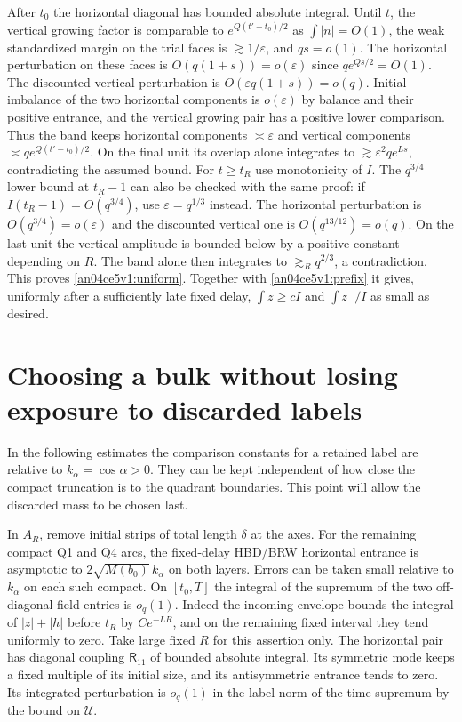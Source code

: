 \documentclass[11pt]{article}
\newcommand{\eps}{\varepsilon}
\begin{document}
After $t_0$ the horizontal diagonal has bounded absolute integral.
Until $t$, the vertical growing factor is comparable to $e^{Q(t'-t_0)/2}$
as $\int|n|=O(1)$, the weak standardized margin on the trial faces is
$\gtrsim1/\eps$, and $q s=o(1)$. The horizontal perturbation on these
faces is $O(q(1+s))=o(\eps)$ since $qe^{Qs/2}=O(1)$. The discounted
vertical perturbation is $O(\eps q(1+s))=o(q)$. Initial imbalance of
the two horizontal components is $o(\eps)$ by balance and their positive
entrance, and the vertical growing pair has a positive lower comparison.
Thus the band keeps horizontal components $\asymp\eps$ and vertical
components $\asymp q e^{Q(t'-t_0)/2}$. On the final unit its overlap alone
integrates to $\gtrsim \eps^2 q e^{Ls}$, contradicting the assumed bound.
For $t\ge t_R$ use monotonicity of $I$. The $q^{3/4}$ lower bound
at $t_R-1$ can also be checked with the same proof: if
$I(t_R-1)=O(q^{3/4})$, use $\eps=q^{1/3}$ instead. The horizontal
perturbation is $O(q^{3/4})=o(\eps)$ and the discounted vertical one
is $O(q^{13/12})=o(q)$. On the last unit the vertical amplitude is
bounded below by a positive constant depending on $R$. The band alone
then integrates to $\gtrsim_R q^{2/3}$, a contradiction.
This proves \eqref{an04ce5v1:uniform}. Together with
\eqref{an04ce5v1:prefix} it gives, uniformly after a sufficiently late fixed
delay, $\int z\ge c I$ and $\int z_-/I$ as small as desired.

\section{Choosing a bulk without losing exposure to discarded labels}\label{an04ce5v1:retained}
In the following estimates the comparison constants for a retained label
are relative to $k_\alpha=\cos\alpha>0$. They can be kept independent of
how close the compact truncation is to the quadrant boundaries. This
point will allow the discarded mass to be chosen last.

In $A_R$, remove initial strips of total length $\delta$ at the axes.
For the remaining compact Q1 and Q4 arcs, the fixed-delay HBD/BRW
horizontal entrance is asymptotic to $2\sqrt{M(b_0)}\,k_\alpha$ on both
layers. Errors can be taken small relative to $k_\alpha$ on each such
compact. On $[t_0,T]$ the integral of the supremum of the two
off-diagonal field entries is $o_q(1)$. Indeed the incoming envelope
bounds the integral of $|z|+|h|$ before $t_R$ by $Ce^{-LR}$, and on the
remaining fixed interval they tend uniformly to zero. Take large fixed
$R$ for this assertion only. The horizontal pair has diagonal coupling
$\mathsf R_{11}$ of bounded absolute integral. Its symmetric mode keeps
a fixed multiple of its initial size, and its antisymmetric entrance tends
to zero. Its integrated perturbation is $o_q(1)$ in the label norm of
the time supremum by the bound on $\mathcal U$.
\end{document}
